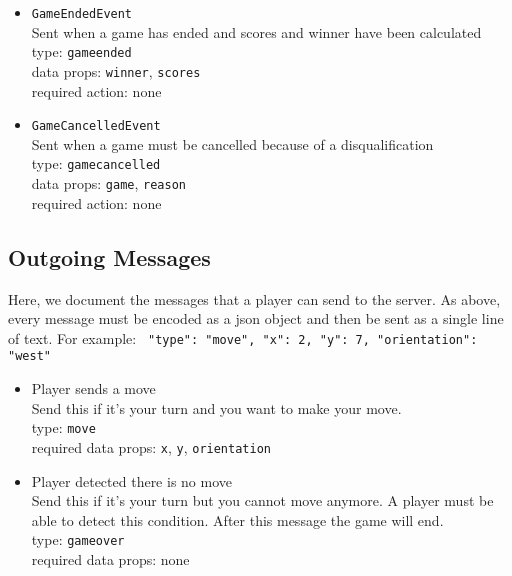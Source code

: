 \documentclass{scrartcl}
\begin{document}
\begin{itemize}
\item \texttt{GameEndedEvent} \\
  Sent when a game has ended and scores and winner have been calculated \\
  type: \texttt{gameended} \\
  data props: \texttt{winner}, \texttt{scores} \\
  required action: none

\item \texttt{GameCancelledEvent} \\
  Sent when a game must be cancelled because of a disqualification \\
  type: \texttt{gamecancelled} \\
  data props: \texttt{game}, \texttt{reason} \\
  required action: none
\end{itemize}


\subsection{Outgoing Messages}
Here, we document the messages that a player can send to the server.
As above, every message must be encoded as a json object and then be
sent as a single line of text. For example:
\texttt{{ "type": "move", "x": 2, "y": 7, "orientation": "west" }}

\begin{itemize}
\item Player sends a move \\
  Send this if it's your turn and you want to make your move. \\
  type: \texttt{move} \\
  required data props: \texttt{x}, \texttt{y}, \texttt{orientation}

\item Player detected there is no move \\
  Send this if it's your turn but you cannot move anymore. A player
  must be able to detect this condition. After this message the game
  will end. \\
  type: \texttt{gameover} \\
  required data props: none
\end{itemize}
\end{document}
